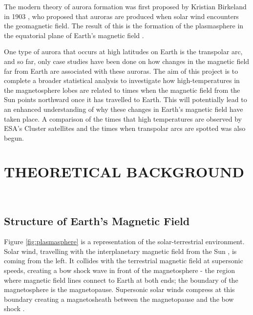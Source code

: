 \documentclass[12pt]{article}
\begin{document}
The modern theory of aurora formation was first proposed by Kristian Birkeland in 1903 \cite{birkeland2018norwegian}, who proposed that auroras are produced when solar wind encounters the geomagnetic field. The result of this is the formation of the plasmasphere in the equatorial plane of Earth's magnetic field \cite{cosmicelectrodyn}.

One type of aurora that occurs at high latitudes on Earth is the transpolar arc, and so far, only case studies have been done on how changes in the magnetic field far from Earth are associated with these auroras. The aim of this project is to complete a broader statistical analysis to investigate how high-temperatures in the magnetosphere lobes are related to times when the magnetic field from the Sun points northward once it has travelled to Earth. This will potentially lead to an enhanced understanding of why these changes in Earth's magnetic field have taken place. A comparison of the times that high temperatures are observed by ESA's Cluster satellites and the times when transpolar arcs are spotted was also begun.

\section{THEORETICAL BACKGROUND}
\hfill \\
\hfill

\subsection{Structure of Earth's Magnetic Field}
Figure \ref{fig:plasmasphere} is a representation of the solar-terrestrial environment. Solar wind, travelling with the interplanetary magnetic field from the Sun \cite{Svalgaard_2010}, is coming from the left. It collides with the terrestrial magnetic field at supersonic speeds, creating a bow shock wave in front of the magnetosphere - the region where magnetic field lines connect to Earth at both ends; the boundary of the magnetosphere is the magnetopause. Supersonic solar winds compress at this boundary creating a magnetosheath between the magnetopause and the bow shock \cite{BSPP}.
\end{document}

